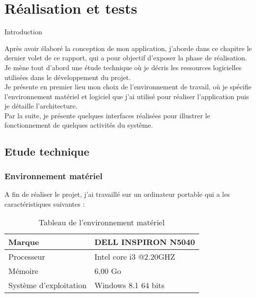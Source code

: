 \chapter*{Réalisation et tests}

\setcounter{page}{0}
\thispagestyle{empty}

\newpage


\fancyhf{}%
{\headrule
  { \thepage}\footrule}
\pagestyle{ruled}

\renewcommand\makeheadrule{\color{cyan}\rule[-.3\baselineskip]{\linewidth}{2.5pt}}
\renewcommand\makefootrule{\color{cyan}\rule[\baselineskip]{\linewidth}{2.5pt}}


\begin{Large}
Introduction 
\end{Large}

Après avoir élaboré la conception de mon application, j’aborde dans ce chapitre le dernier volet de ce rapport, qui a pour objectif d'exposer la phase de réalisation.\\
Je mène tout d’abord une étude technique où je décris les ressources logicielles utilisées dans le développement du projet.\\
 Je présente en premier lieu mon choix de l’environnement de travail, où je spécifie l’environnement matériel et logiciel que j’ai utilisé pour réaliser l’application puis je détaille l’architecture.\\
Par la suite, je présente quelques interfaces réalisées pour illustrer le fonctionnement de quelques activités du système. 

\section{Etude technique}

\subsection{Environnement matériel}
A fin de réaliser le projet, j’ai travaillé sur un ordinateur portable qui a les caractéristiques suivantes :\\ 

\begin{table}[!h]
\begin{center}
\begin{tabular}{|l|l|}
\hline 
Marque & DELL INSPIRON N5040 \\ 
\hline 
Processeur & Intel core i3 @2.20GHZ \\ 
\hline 
Mémoire & 6,00 Go \\ 
\hline 
Système d'exploitation & Windows 8.1 64 bits \\ 
\hline 
\end{tabular} 
\end{center}
\caption{Tableau de l'environnement matériel}
\end{table}

